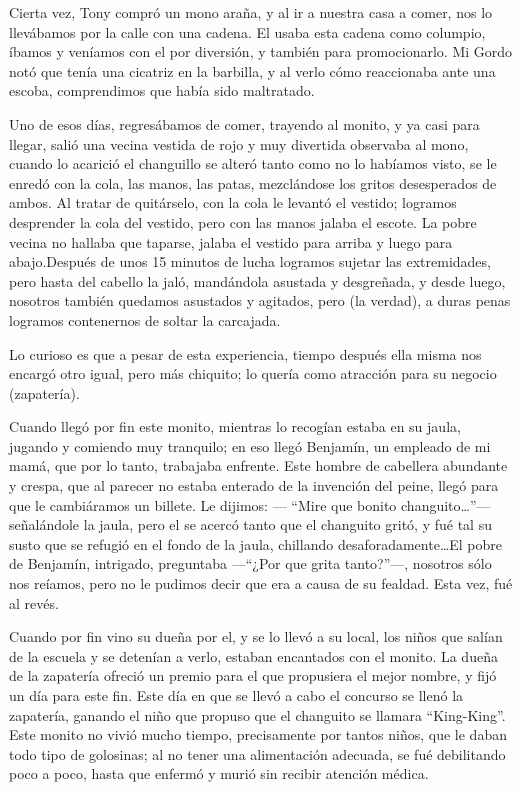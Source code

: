 \documentclass[letterpaper, 12pt]{book}
\begin{document}
Cierta vez, Tony compró un mono araña, y al ir a nuestra casa a comer, nos lo llevábamos por la calle con una cadena. El usaba esta cadena como columpio, íbamos y veníamos con el por diversión, y también para promocionarlo. Mi Gordo notó que tenía una cicatriz en la barbilla, y al verlo cómo reaccionaba ante una escoba, comprendimos que había sido maltratado.

Uno de esos días, regresábamos de comer, trayendo al monito, y ya casi para llegar, salió una vecina vestida de rojo y muy divertida observaba al mono, cuando lo acarició el changuillo se alteró tanto como no lo habíamos visto, se le enredó con la cola, las manos, las patas, mezclándose los gritos desesperados de ambos. Al tratar de quitárselo, con la cola le levantó el vestido; logramos desprender la cola del vestido, pero con las manos jalaba el escote. La pobre vecina no hallaba que taparse, jalaba el vestido para arriba y luego para abajo.Después de unos 15 minutos de lucha logramos sujetar las extremidades, pero hasta del cabello la jaló, mandándola asustada y desgreñada, y desde luego, nosotros también quedamos asustados y agitados, pero (la verdad), a duras penas logramos contenernos de soltar la carcajada.

Lo curioso es que a pesar de esta experiencia, tiempo después ella misma nos encargó otro igual, pero más chiquito; lo quería como atracción para su negocio (zapatería).

Cuando llegó por fin este monito, mientras lo recogían estaba en su jaula, jugando y comiendo muy tranquilo; en eso llegó Benjamín, un empleado de mi mamá, que por lo tanto, trabajaba enfrente. Este hombre de cabellera abundante y crespa, que al parecer no estaba enterado de la invención del peine, llegó para que le cambiáramos un billete. Le dijimos: --- ``Mire que bonito changuito\ldots''--- señalándole la jaula, pero el se acercó tanto que el changuito gritó, y fué tal su susto que se refugió en el fondo de la jaula, chillando desaforadamente\ldots El pobre de Benjamín, intrigado, preguntaba ---``¿Por que grita tanto?''---, nosotros sólo nos reíamos, pero no le pudimos decir que era a causa de su fealdad. Esta vez, fué al revés.

Cuando por fin vino su dueña por el, y se lo llevó a su local, los niños que salían de la escuela y se detenían a verlo, estaban encantados con el monito. La dueña de la zapatería ofreció un premio para el que propusiera el mejor nombre, y fijó un día para este fin.
Este día en que se llevó a cabo el concurso se llenó la zapatería, ganando el niño que propuso que el changuito se llamara ``King-King''.  Este monito no vivió mucho tiempo, precisamente por tantos niños, que le daban todo tipo de golosinas; al no tener una alimentación adecuada, se fué debilitando poco a poco, hasta que enfermó y murió sin recibir atención médica.
\end{document}
